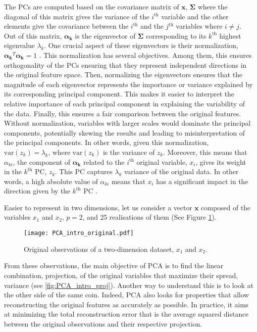The PCs are computed based on the covariance matrix of $\mathbf{x}$, $\mathbf{\Sigma}$ where the diagonal of this matrix gives the variance of the $i^{\text{th}}$ variable and the other elements give the covariance between the $i^{\text{th}}$ and the $j^{\text{th}}$ variables where $i\neq j$. Out of this matrix, $\mathbf{\alpha_k}$ is the eigenvector of $\mathbf{\Sigma}$ corresponding to its $k^{\text{th}}$ highest eigenvalue $\lambda_k$. One crucial aspect of these eigenvectors is their normalization, \ie $\mathbf{\alpha_k}^{T}\mathbf{\alpha_k}=1$ \cite{jolliffe2002principal}. This normalization has several objectives. Among them, this ensures orthogonality of the PCs ensuring that they represent independent directions in the original feature space. Then, normalizing the eigenvectors ensures that the magnitude of each eigenvector represents the importance or variance explained by its corresponding principal component. This makes it easier to interpret the relative importance of each principal component in explaining the variability of the data. Finally, this ensures a fair comparison between the original features. Without normalization, variables with larger scales would dominate the principal components, potentially skewing the results and leading to misinterpretation of the principal components. In other words, given this normalization, $\mathrm{var}\left(z_k\right)=\lambda_k$, where $\mathrm{var}\left(z_k\right)$ is the variance of $z_k$. Moreover, this means that $\alpha_{ki}$, \ie the component of $ \mathbf{\alpha_k}$ related to the $i^{\text{th}}$ original variable, $x_i$,  gives its weight in the $k^{\text{th}}$ PC, \ie $z_k$. This PC captures $\lambda_k$ variance of the original data. In other words, a high absolute value of $\alpha_{ki}$ means that $x_i$ has a significant impact in the direction given by the $k^{\text{th}}$ PC \cite{zdybal2022advancing}. 

Easier to represent in two dimensions, let us consider a vector $\mathbf{x}$ composed of the variables $x_1$ and $x_2$, $p=2$, and 25 realisations of them (See Figure \ref{fig:PCA_intro_original}). 

\begin{figure}[!htbp]
\centering
\texttt{[image: PCA\_intro\_original.pdf]}
\caption{Original observations of a two-dimension dataset, $x_1$ and $x_2$.}
\label{fig:PCA_intro_original}
\end{figure}

From these observations, the main objective of \gls{PCA} is to find the linear combination, \ie projection, of the original variables that maximize their spread, \ie variance (see \ref{fig:PCA_intro_proj}).  Another way to understand this is to look at the other side of the same coin. Indeed, \gls{PCA} also looks for properties that allow reconstructing the original features as accurately as possible. In practice, it aims at minimizing the total reconstruction error that is the average squared distance between the original observations and their respective projection. 

